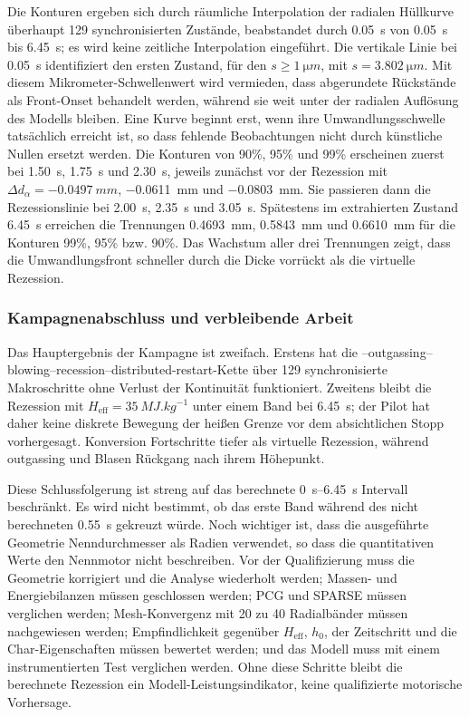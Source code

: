 \documentclass[oneside,openany]{amsdtx}
\begin{document}
Die Konturen ergeben sich durch räumliche Interpolation der radialen  Hüllkurve überhaupt 129 synchronisierten Zustände, beabstandet durch \SI{0.05}{s} von \SI{0.05}{s} bis \SI{6.45}{s}; es wird keine zeitliche Interpolation eingeführt. Die vertikale Linie bei \SI{0.05}{s} identifiziert den ersten Zustand, für den \(s\geq\SI{1}{\micro m}\), mit \(s=\SI{3.802}{\micro m}\). Mit diesem Mikrometer-Schwellenwert wird vermieden, dass abgerundete Rückstände als Front-Onset behandelt werden, während sie weit unter der radialen Auflösung des Modells bleiben. Eine Kurve beginnt erst, wenn ihre Umwandlungsschwelle tatsächlich erreicht ist, so dass fehlende Beobachtungen nicht durch künstliche Nullen ersetzt werden. Die Konturen von 90\%, 95\% und 99\% erscheinen zuerst bei \SI{1.50}{s}, \SI{1.75}{s} und \SI{2.30}{s}, jeweils zunächst vor der Rezession mit \(\Delta d_\alpha=\SI{-0.0497}{mm}\), \SI{-0.0611}{mm} und \SI{-0.0803}{mm}. Sie passieren dann die Rezessionslinie bei \SI{2.00}{s}, \SI{2.35}{s} und \SI{3.05}{s}. Spätestens im extrahierten Zustand \SI{6.45}{s} erreichen die Trennungen \SI{0.4693}{mm}, \SI{0.5843}{mm} und \SI{0.6610}{mm} für die Konturen 99\%, 95\% bzw. 90\%. Das Wachstum aller drei Trennungen zeigt, dass die Umwandlungsfront schneller durch die Dicke vorrückt als die virtuelle Rezession.

\subsubsection{Kampagnenabschluss und verbleibende Arbeit}

Das Hauptergebnis der Kampagne ist zweifach. Erstens hat die --outgassing--blowing--recession--distributed-restart-Kette über 129 synchronisierte Makroschritte ohne Verlust der Kontinuität funktioniert. Zweitens bleibt die Rezession mit \(H_\mathrm{eff}=\SI{35}{MJ.kg^{-1}}\) unter einem Band bei \SI{6.45}{s}; der Pilot hat daher keine diskrete Bewegung der heißen Grenze vor dem absichtlichen Stopp vorhergesagt. Konversion Fortschritte tiefer als virtuelle Rezession, während outgassing und Blasen Rückgang nach ihrem Höhepunkt.

Diese Schlussfolgerung ist streng auf das berechnete \SIrange{0}{6.45}{s} Intervall beschränkt. Es wird nicht bestimmt, ob das erste Band während des nicht berechneten \SI{0.55}{s} gekreuzt würde. Noch wichtiger ist, dass die ausgeführte Geometrie Nenndurchmesser als Radien verwendet, so dass die quantitativen Werte den Nennmotor nicht beschreiben. Vor der Qualifizierung muss die Geometrie korrigiert und die Analyse wiederholt werden; Massen- und Energiebilanzen müssen geschlossen werden; PCG und SPARSE müssen verglichen werden; Mesh-Konvergenz mit 20 zu 40 Radialbänder müssen nachgewiesen werden; Empfindlichkeit gegenüber \(H_\mathrm{eff}\), \(h_0\), der Zeitschritt und die Char-Eigenschaften müssen bewertet werden; und das Modell muss mit einem instrumentierten Test verglichen werden. Ohne diese Schritte bleibt die berechnete Rezession ein Modell-Leistungsindikator, keine qualifizierte motorische Vorhersage.
\end{document}
